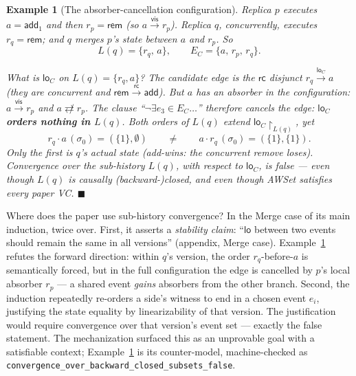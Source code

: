 \documentclass[11pt]{article}
\newtheorem{example}[theorem]{Example}
\newcommand{\vis}{\xrightarrow{\mathsf{vis}}}
\newcommand{\rc}{\xrightarrow{\mathsf{rc}}}
\newcommand{\loC}{\xrightarrow{\mathsf{lo}_{C}}}
\newcommand{\ncomm}{\not\rightleftarrows}
\newcommand{\add}{\mathsf{add}}
\newcommand{\rem}{\mathsf{rem}}
\newcommand{\Sinit}{\sigma_0}
\newcommand{\lean}[1]{\texttt{#1}}
\begin{document}
\begin{example}[The absorber-cancellation configuration]
\label{ex:absorber}
Replica $p$ executes $a = \add_1$ and then $r_p = \rem$ (so $a \vis r_p$).
Replica $q$, concurrently, executes $r_q = \rem$; and $q$ merges $p$'s
state \emph{between} $a$ and $r_p$. So
\[
L(q) = \{r_q,\, a\}, \qquad E_C = \{a,\, r_p,\, r_q\}.
\]

\begin{center}
\end{center}

What is $\mathsf{lo}_C$ on $L(q) = \{r_q, a\}$? The candidate edge is the
$\mathsf{rc}$ disjunct $r_q \loC a$ (they are concurrent and
$\rem \rc \add$). But $a$ has an absorber \emph{in the configuration}:
$a \vis r_p$ and $a \ncomm r_p$. The clause
``$\neg\exists e_3 \in E_C\ldots$'' therefore \emph{cancels} the edge:
\textbf{$\mathsf{lo}_C$ orders nothing in $L(q)$}. Both orders of $L(q)$
extend $\mathsf{lo}_C\restriction_{L(q)}$, yet
\[
r_q \cdot a\,(\Sinit) = (\{1\}, \emptyset)
\qquad\neq\qquad
a \cdot r_q\,(\Sinit) = (\{1\}, \{1\}).
\]
Only the first is $q$'s actual state (add-wins: the concurrent remove
loses). \emph{Convergence over the sub-history $L(q)$, with respect to
$\mathsf{lo}_C$, is false} --- even though $L(q)$ is causally
(backward-)closed, and even though \textsf{AWSet} satisfies every paper
VC. \hfill$\blacksquare$
\end{example}

Where does the paper use sub-history convergence? In the Merge case of
its main induction, twice over. First, it asserts a \emph{stability
claim}: ``$\mathsf{lo}$ between two events should remain the same in all
versions'' (appendix, Merge case). Example~\ref{ex:absorber} refutes the
forward direction: within $q$'s version, the order $r_q$-before-$a$ is
semantically forced, but in the full configuration the edge is cancelled
by $p$'s local absorber $r_p$ --- a shared event \emph{gains} absorbers
from the other branch. Second, the induction repeatedly re-orders a
side's witness to end in a chosen event $e_i$, justifying the state
equality by linearizability of that version. The justification would
require convergence over that version's event set --- exactly the false
statement. The mechanization surfaced this as an unprovable goal with a
satisfiable context; Example~\ref{ex:absorber} is its counter-model,
machine-checked as
\lean{convergence\_over\_backward\_closed\_subsets\_false}.
\end{document}
